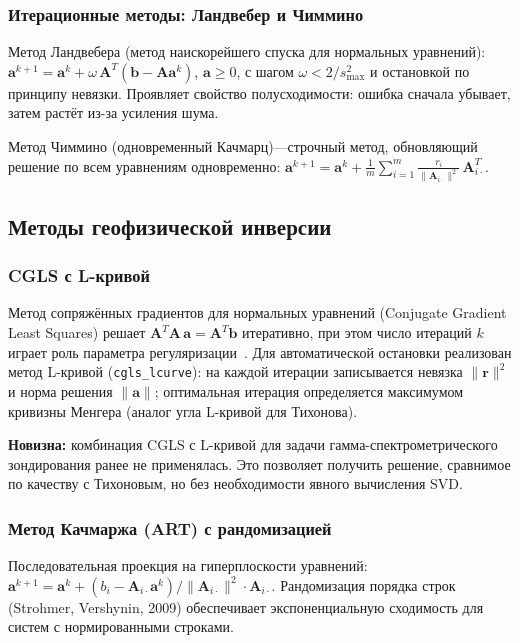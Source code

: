 \documentclass[12pt,a4paper]{article}
\newcommand{\va}{\mathbf{a}}
\newcommand{\vb}{\mathbf{b}}
\newcommand{\vr}{\mathbf{r}}
\newcommand{\mA}{\mathbf{A}}
\begin{document}
\subsubsection{Итерационные методы: Ландвебер и Чиммино}

Метод Ландвебера (метод наискорейшего спуска для нормальных уравнений):
$\va^{k+1} = \va^k + \omega\, \mA^T(\vb - \mA\va^k)$, $\va \geq 0$,
с шагом $\omega < 2/s_{\max}^2$ и остановкой по принципу невязки.
Проявляет свойство полусходимости: ошибка сначала убывает,
затем растёт из-за усиления шума.

Метод Чиммино (одновременный Качмарц)---строчный метод,
обновляющий решение по всем уравнениям одновременно:
$\va^{k+1} = \va^k + \frac{1}{m} \sum_{i=1}^m
  \frac{r_i}{\|\mA_{i\cdot}\|^2}\,\mA_{i\cdot}^T$.

\subsection{Методы геофизической инверсии}
\label{sub:geophysics_solvers}

\subsubsection{CGLS с L-кривой}
\label{sub:cgls}

Метод сопряжённых градиентов для нормальных уравнений
(Conjugate Gradient Least Squares) решает $\mA^T\mA\,\va = \mA^T\vb$
итеративно, при этом число итераций $k$ играет роль параметра
регуляризации~\citep{Chen2024}.
Для автоматической остановки реализован метод L-кривой
(\texttt{cgls\_lcurve}): на каждой итерации записывается невязка
$\|\vr\|^2$ и норма решения $\|\va\|$; оптимальная итерация
определяется максимумом кривизны Менгера (аналог угла L-кривой
для Тихонова).

\textbf{Новизна:} комбинация CGLS с L-кривой для задачи
гамма-спектрометрического зондирования ранее не применялась.
Это позволяет получить решение, сравнимое по качеству с Тихоновым,
но без необходимости явного вычисления SVD.

\subsubsection{Метод Качмаржа (ART) с рандомизацией}

Последовательная проекция на гиперплоскости уравнений:
$\va^{k+1} = \va^k + (b_i - \mA_{i\cdot}\va^k)/\|\mA_{i\cdot}\|^2 \cdot \mA_{i\cdot}$.
Рандомизация порядка строк (Strohmer, Vershynin, 2009) обеспечивает
экспоненциальную сходимость для систем с нормированными строками.
\end{document}
